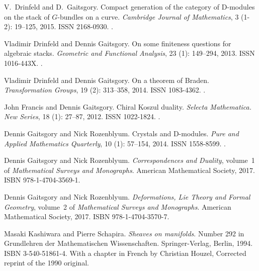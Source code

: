 \documentclass{oupau}
\theoremstyle{remark}
\begin{document}
\begin{thebibliography}{20}
V.~Drinfeld and D.~Gaitsgory.
\newblock Compact generation of the category of {D}-modules on the stack of
  {$G$}-bundles on a curve.
\newblock \emph{Cambridge Journal of Mathematics}, 3 (1-2):
  19--125, 2015.
\newblock ISSN 2168-0930.
\newblock {}.

Vladimir Drinfeld and Dennis Gaitsgory.
\newblock On some finiteness questions for algebraic stacks.
\newblock \emph{Geometric and Functional Analysis}, 23 (1):
  149--294, 2013.
\newblock ISSN 1016-443X.
\newblock {}.

Vladimir Drinfeld and Dennis Gaitsgory.
\newblock On a theorem of {B}raden.
\newblock \emph{Transformation Groups}, 19 (2): 313--358,
  2014.
\newblock ISSN 1083-4362.
\newblock {}.

John Francis and Dennis Gaitsgory.
\newblock Chiral {K}oszul duality.
\newblock \emph{Selecta Mathematica. New Series}, 18 (1):
  27--87, 2012.
\newblock ISSN 1022-1824.
\newblock {}.

Dennis Gaitsgory and Nick Rozenblyum.
\newblock Crystals and {D}-modules.
\newblock \emph{Pure and Applied Mathematics Quarterly}, 10
  (1): 57--154, 2014.
\newblock ISSN 1558-8599.
\newblock {}.

Dennis Gaitsgory and Nick Rozenblyum.
\newblock \emph{Correspondences and Duality}, volume~1 of \emph{Mathematical
  Surveys and Monographs}.
\newblock American Mathematical Society, 2017{}.
\newblock ISBN 978-1-4704-3569-1.

Dennis Gaitsgory and Nick Rozenblyum.
\newblock \emph{Deformations, Lie Theory and Formal Geometry}, volume~2 of
  \emph{Mathematical Surveys and Monographs}.
\newblock American Mathematical Society, 2017{}.
\newblock ISBN 978-1-4704-3570-7.

Masaki Kashiwara and Pierre Schapira.
\newblock \emph{Sheaves on manifolds}.
\newblock Number 292 in Grundlehren der Mathematischen Wissenschaften.
  Springer-Verlag, Berlin, 1994.
\newblock ISBN 3-540-51861-4.
\newblock With a chapter in French by Christian Houzel, Corrected reprint of
  the 1990 original.


\end{thebibliography}
\end{document}
